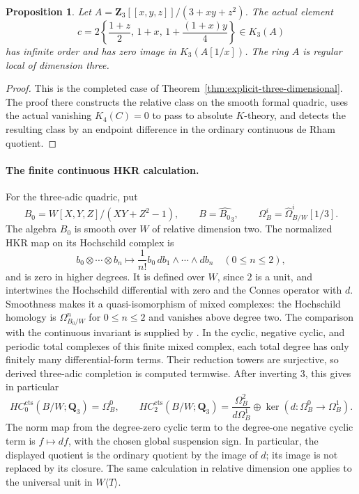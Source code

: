 \documentclass[11pt,a4paper]{amsart}
\numberwithin{equation}{section}
\newtheorem{proposition}[theorem]{Proposition}
\theoremstyle{definition}
\theoremstyle{remark}
\begin{document}
\begin{proposition}
\label{d3:prop:directtcoriginal}
Let $A=\mathbf Z_3[[x,y,z]]/(3+xy+z^2)$. The actual element
\[
 c=2\left\{\frac{1+z}{2},\,1+x,\,
                        1+\frac{(1+x)y}{4}\right\}\in K_3(A)
\]
has infinite order and has zero image in $K_3(A[1/x])$.
The ring $A$ is regular local of dimension three.
\end{proposition}
\begin{proof}
This is the completed case of Theorem~\ref{thm:explicit-three-dimensional}.
The proof there constructs the relative class on the smooth formal quadric,
uses the actual vanishing $K_4(C)=0$ to pass to absolute $K$-theory,
and detects the resulting class by an endpoint difference in the ordinary
continuous de Rham quotient.
\end{proof}

\paragraph{The finite continuous HKR calculation.}
For the three-adic quadric, put
\[
 B_0=W[X,Y,Z]/(XY+Z^2-1),\qquad B=\widehat{B_0}_3,
 \qquad \Omega_B^i=\widehat\Omega^i_{B/W}[1/3].
\]
The algebra $B_0$ is smooth over $W$ of relative dimension two.
The normalized HKR map on its Hochschild complex is
\[
 b_0\otimes\cdots\otimes b_n\longmapsto
 \frac{1}{n!}b_0\,db_1\wedge\cdots\wedge db_n
 \quad(0\le n\le2),
\]
and is zero in higher degrees.  It is defined over $W$, since $2$ is
a unit, and intertwines the Hochschild differential with zero and the
Connes operator with $d$.  Smoothness makes it a quasi-isomorphism of
mixed complexes: the Hochschild homology is $\Omega^n_{B_0/W}$ for
$0\le n\le2$ and vanishes above degree two.
The comparison with the continuous invariant is supplied by
\cite[Proposition~4.2]{AMMN}.  In the cyclic, negative cyclic, and
periodic total complexes of this finite mixed complex, each total
degree has only finitely many differential-form terms.  Their
reduction towers are surjective, so derived three-adic completion is
computed termwise.  After inverting $3$, this gives in particular
\[
 HC^{\mathrm{cts}}_0(B/W;\mathbf Q_3)=\Omega_B^0,
 \qquad
 HC^{\mathrm{cts}}_2(B/W;\mathbf Q_3)
   =\frac{\Omega_B^2}{d\Omega_B^1}
     \oplus\ker(d:\Omega_B^0\to\Omega_B^1).
\]
The norm map from the degree-zero cyclic term to the degree-one
negative cyclic term is $f\mapsto df$, with the chosen global
suspension sign.  In particular, the displayed quotient is the
ordinary quotient by the image of $d$; its image is not replaced by
its closure.  The same calculation in relative dimension one applies
to the universal unit in $W\langle T\rangle$.
\end{document}

